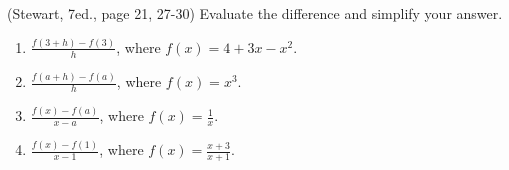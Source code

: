 \begin{problem}(Stewart, 7ed., page 21, 27-30)
Evaluate the difference and simplify your answer.
\begin{multicols}{2}
\begin{enumerate}
\item $\frac{f(3+h)-f(3)}{h}$, where $f(x)=4+3x-x^2$.
\item $\frac{f(a+h)-f(a)}{h}$, where $f(x)= x^3$.
\item $\frac{f(x)-f(a)}{x-a}$, where $f(x)=\frac{1}{x}$.
\item $\frac{f(x)-f(1)}{x-1}$, where $f(x)=\frac{x+3}{x+1}$.
\end{enumerate}
\end{multicols}
\end{problem}
